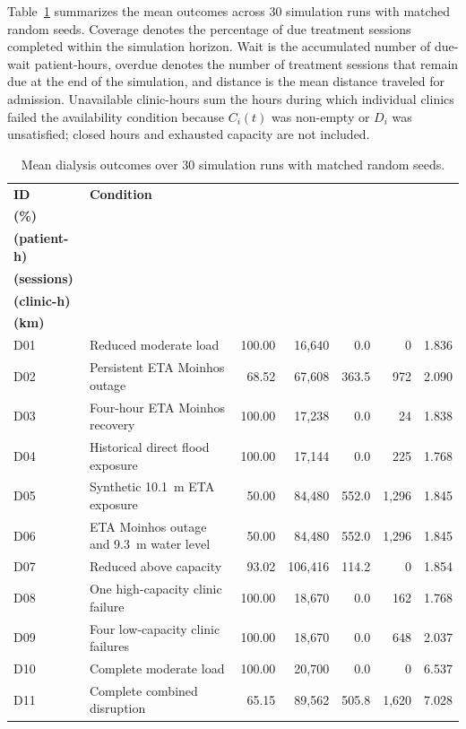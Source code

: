 Table~\ref{tbl:dialysis_results} summarizes the mean outcomes across 30 simulation runs with matched random seeds. Coverage denotes the percentage of due treatment sessions completed within the simulation horizon. Wait is the accumulated number of due-wait patient-hours, overdue denotes the number of treatment sessions that remain due at the end of the simulation, and distance is the mean distance traveled for admission. Unavailable clinic-hours sum the hours during which individual clinics failed the availability condition because $C_i(t)$ was non-empty or $D_i$ was unsatisfied; closed hours and exhausted capacity are not included.

\begin{table}[ht]
\centering
\footnotesize
\setlength{\tabcolsep}{3pt}
\caption{Mean dialysis outcomes over 30 simulation runs with matched random seeds.}
\label{tbl:dialysis_results}
\begin{tabularx}{\linewidth}{
    @{}
    l
    >{\raggedright\arraybackslash}X
    rrrrr
    @{}
}
\toprule
\textbf{ID} &
\textbf{Condition} &
\shortstack{\textbf{Coverage}\\\textbf{(\%)}} &
\shortstack{\textbf{Wait}\\\textbf{(patient-h)}} &
\shortstack{\textbf{Overdue}\\\textbf{(sessions)}} &
\shortstack{\textbf{Unavailable}\\\textbf{(clinic-h)}} &
\shortstack{\textbf{Mean distance}\\\textbf{(km)}} \\
\midrule
D01 & Reduced moderate load
    & 100.00 &  16,640 &   0.0 &     0 & 1.836 \\
D02 & Persistent ETA Moinhos outage
    &  68.52 &  67,608 & 363.5 &   972 & 2.090 \\
D03 & Four-hour ETA Moinhos recovery
    & 100.00 &  17,238 &   0.0 &    24 & 1.838 \\
D04 & Historical direct flood exposure
    & 100.00 &  17,144 &   0.0 &   225 & 1.768 \\
D05 & Synthetic 10.1~m ETA exposure
    &  50.00 &  84,480 & 552.0 & 1,296 & 1.845 \\
D06 & ETA Moinhos outage and 9.3~m water level
    &  50.00 &  84,480 & 552.0 & 1,296 & 1.845 \\
D07 & Reduced above capacity
    &  93.02 & 106,416 & 114.2 &     0 & 1.854 \\
D08 & One high-capacity clinic failure
    & 100.00 &  18,670 &   0.0 &   162 & 1.768 \\
D09 & Four low-capacity clinic failures
    & 100.00 &  18,670 &   0.0 &   648 & 2.037 \\
D10 & Complete moderate load
    & 100.00 &  20,700 &   0.0 &     0 & 6.537 \\
D11 & Complete combined disruption
    &  65.15 &  89,562 & 505.8 & 1,620 & 7.028 \\
\bottomrule
\end{tabularx}
\end{table}


